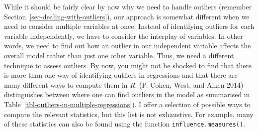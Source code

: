 \documentclass[
  letterpaper,
]{krantz}
\begin{document}
While it should be fairly clear by now why we need to handle outliers
(remember Section~\ref{sec-dealing-with-outliers}), our approach is
somewhat different when we need to consider multiple variables at once.
Instead of identifying outliers for each variable independently, we have
to consider the interplay of variables. In other words, we need to find
out how an outlier in our independent variable affects the overall model
rather than just one other variable. Thus, we need a different technique
to assess outliers. By now, you might not be shocked to find that there
is more than one way of identifying outliers in regressions and that
there are many different ways to compute them in \emph{R}. (P. Cohen,
West, and Aiken 2014) distinguishes between where one can find outliers
in the model as summarised in
Table~\ref{tbl-outliers-in-multiple-regressions}). I offer a selection
of possible ways to compute the relevant statistics, but this list is
not exhaustive. For example, many of these statistics can also be found
using the function \texttt{influence.measures()}.
\end{document}
